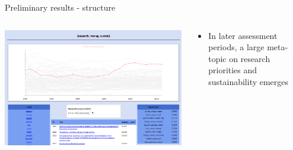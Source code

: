 \documentclass[9pt]{beamer}
\begin{document}
\begin{frame}{Preliminary results - structure}

\begin{columns}
	\begin{column}{0.6\linewidth}
		\begin{center}			
			\includegraphics[width=\linewidth]{../plots/sustainability.PNG}
		\end{center}
	\end{column}
	\begin{column}{0.4\linewidth}
		\begin{center}
			\begin{itemize}
				\item In later assessment periods, a large meta-topic on research priorities and sustainability emerges
			\end{itemize}
		\end{center}
	\end{column}
\end{columns}

\end{frame}
\end{document}
